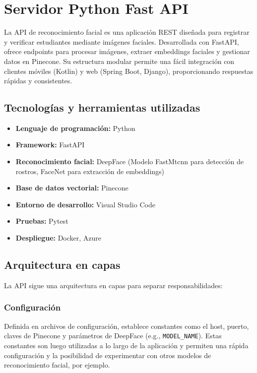 \section{Servidor Python Fast API}

La API de reconocimiento facial es una aplicación REST diseñada para registrar y verificar estudiantes mediante imágenes faciales. Desarrollada con FastAPI, ofrece endpoints para procesar imágenes, extraer embeddings faciales y gestionar datos en Pinecone. Su estructura modular permite una fácil integración con clientes móviles (Kotlin) y web (Spring Boot, Django), proporcionando respuestas rápidas y consistentes.

\subsection{Tecnologías y herramientas utilizadas}
\begin{itemize}
	\item \textbf{Lenguaje de programación:} Python
	\item \textbf{Framework:} FastAPI
	\item \textbf{Reconocimiento facial:} DeepFace (Modelo FastMtcnn para detección de rostros, FaceNet para extracción de embeddings)
	\item \textbf{Base de datos vectorial:} Pinecone
	\item \textbf{Entorno de desarrollo:} Visual Studio Code
	\item \textbf{Pruebas:} Pytest
	\item \textbf{Despliegue:} Docker, Azure
\end{itemize}

\subsection{Arquitectura en capas}
La API sigue una arquitectura en capas para separar responsabilidades:

\subsubsection*{Configuración}
Definida en archivos de configuración, establece constantes como el host, puerto, claves de Pinecone y parámetros de DeepFace (e.g., \texttt{MODEL\_NAME}).
Estas constantes son luego utilizadas a lo largo de la aplicación y permiten una rápida configuración y la posibilidad de experimentar con otros modelos de reconocimiento facial, por ejemplo.

